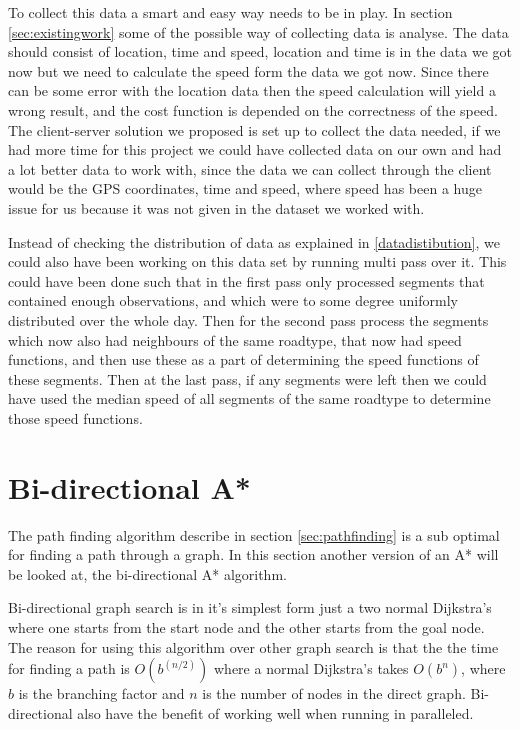 To collect this data a smart and easy way needs to be in play. In section \ref{sec:existingwork} some of the possible way of collecting data is analyse. The data should consist of location, time and speed, location and time is in the data we got now but we need to calculate the speed form the data we got now. Since there can be some error with the location data then the speed calculation will yield a wrong result, and the cost function is depended on the correctness of the speed.
The client-server solution we proposed is set up to collect the data needed, if we had more time for this project we could have collected data on our own and had a lot better data to work with, since the data we can collect through the client would be the GPS coordinates, time and speed, where speed has been a huge issue for us because it was not given in the dataset we worked with.

Instead of checking the distribution of data as explained in \ref{datadistibution}, we could also have been working on this data set by running multi pass over it. This could have been done such that in the first pass only processed segments that contained enough observations, and which were to some degree uniformly distributed over the whole day. Then for the second pass process the segments which now also had neighbours of the same roadtype, that now had speed functions, and then use these as a part of determining the speed functions of these segments. Then at the last pass, if any segments were left then we could have used the median speed of all segments of the same roadtype to determine those speed functions. 

\section{Bi-directional A*} \label{algorithms}
The path finding algorithm describe in section \ref{sec:pathfinding} is a sub optimal for finding a path through a graph. In this section another version of an A* will be looked at, the bi-directional A* algorithm.

Bi-directional graph search is in it's simplest form just a two normal Dijkstra’s where one starts from the start node and the other starts from the goal node.
The reason for using this algorithm over other graph search is that the the time for finding a path is $O(b^{(n/2)})$ where a normal Dijkstra’s takes $O(b^{n})$, where $b$ is the branching factor and $n$ is the number of nodes in the direct graph. Bi-directional also have the benefit of working well when running in paralleled.


